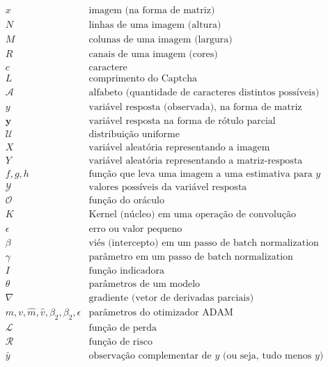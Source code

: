 \documentclass[12pt,twoside,brazilian]{book}
\begin{document}
\begin{displaymath}
\begin{array}{ll}
   x & \text{imagem (na forma de matriz)}\\
   N & \text{linhas de uma imagem (altura)}\\
   M & \text{colunas de uma imagem (largura)}\\
   R & \text{canais de uma imagem (cores)}\\
   c & \text{caractere}\\
   L & \text{comprimento do Captcha}\\
   \mathcal A & \text{alfabeto (quantidade de caracteres distintos possíveis)}\\
   y & \text{variável resposta (observada), na forma de matriz}\\
   \mathbf y & \text{variável resposta na forma de rótulo parcial}\\
   \mathcal U & \text{distribuição uniforme}\\
   X & \text{variável aleatória representando a imagem}\\
   Y & \text{variável aleatória representando a matriz-resposta}\\
   f, g, h & \text{função que leva uma imagem a uma estimativa para } y\\
   \mathcal Y & \text{valores possíveis da variável resposta}\\
   \mathcal O & \text{função do oráculo}\\
   K & \text{Kernel (núcleo) em uma operação de convolução}\\
   \epsilon & \text{erro ou valor pequeno}\\
   \beta & \text{viés (intercepto) em um passo de batch normalization}\\
   \gamma & \text{parâmetro em um passo de batch normalization}\\
   I & \text{função indicadora}\\
   \theta & \text{parâmetros de um modelo}\\
   \nabla & \text{gradiente (vetor de derivadas parciais)}\\
   m,v,\hat m, \hat v, \beta_2, \beta_2, \epsilon & \text{parâmetros do otimizador ADAM}\\
   \mathcal L & \text{função de perda}\\
   \mathcal R & \text{função de risco}\\
   \bar y & \text{observação complementar de } y \text{ (ou seja, tudo menos } y \text{)}
\end{array}
\end{displaymath}
\end{document}
